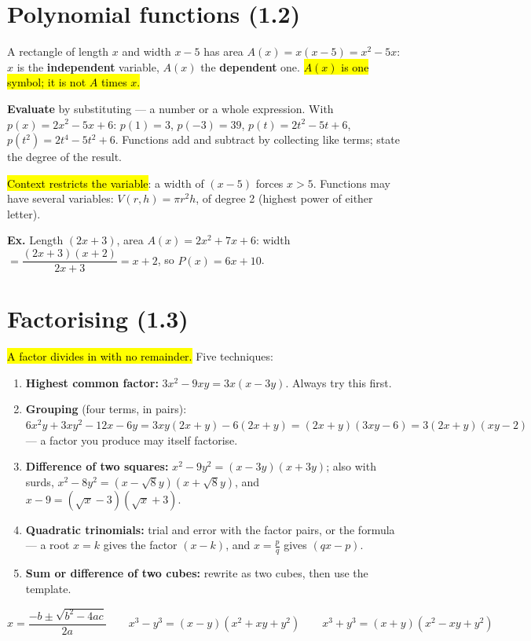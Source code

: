 \documentclass[11pt]{article}
\newcommand{\key}[1]{\hl{#1}}
\newcommand{\wex}[1]{{\color{lilacdeep}\textbf{Ex.}} #1}
\begin{document}
\section{Polynomial functions (1.2)}

A rectangle of length $x$ and width $x-5$ has area $A(x)=x(x-5)=x^{2}-5x$: $x$ is the \textbf{independent} variable, $A(x)$ the \textbf{dependent} one. \key{\mbox{$A(x)$} is one symbol; it is not \mbox{$A$} times \mbox{$x$}.}

\textbf{Evaluate} by substituting --- a number or a whole expression. With $p(x)=2x^{2}-5x+6$: $p(1)=3$, $p(-3)=39$, $p(t)=2t^{2}-5t+6$, $p(t^{2})=2t^{4}-5t^{2}+6$. Functions add and subtract by collecting like terms; state the degree of the result.

\key{Context restricts the variable}: a width of $(x-5)$ forces $x>5$. Functions may have several variables: $V(r,h)=\pi r^{2}h$, of degree 2 (highest power of either letter).

\wex{Length $(2x+3)$, area $A(x)=2x^{2}+7x+6$: width $=\dfrac{(2x+3)(x+2)}{2x+3}=x+2$, so $P(x)=6x+10$.}

\section{Factorising (1.3)}

\key{A factor divides in with no remainder.} Five techniques:

\begin{enumerate}[topsep=1pt,itemsep=0pt,leftmargin=*]
\item \textbf{Highest common factor:} $3x^{2}-9xy=3x(x-3y)$. Always try this first.
\item \textbf{Grouping} (four terms, in pairs): $6x^{2}y+3xy^{2}-12x-6y=3xy(2x+y)-6(2x+y)=(2x+y)(3xy-6)=3(2x+y)(xy-2)$ --- a factor you produce may itself factorise.
\item \textbf{Difference of two squares:} $x^{2}-9y^{2}=(x-3y)(x+3y)$; also with surds, $x^{2}-8y^{2}=(x-\sqrt8y)(x+\sqrt8y)$, and $x-9=(\sqrt x-3)(\sqrt x+3)$.
\item \textbf{Quadratic trinomials:} trial and error with the factor pairs, or the formula --- a root $x=k$ gives the factor $(x-k)$, and $x=\frac pq$ gives $(qx-p)$.
\item \textbf{Sum or difference of two cubes:} rewrite as two cubes, then use the template.
\end{enumerate}

\begin{formulabox}
\[x=\frac{-b\pm\sqrt{b^{2}-4ac}}{2a}\qquad
x^{3}-y^{3}=(x-y)(x^{2}+xy+y^{2})\qquad x^{3}+y^{3}=(x+y)(x^{2}-xy+y^{2})\]
\end{formulabox}
\end{document}
